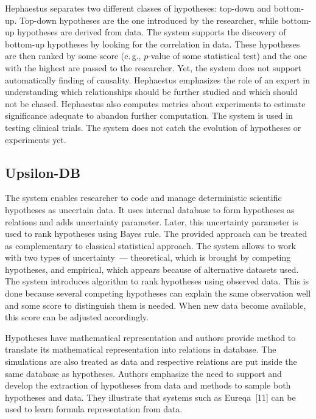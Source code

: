 \begin{multicols}{2}
      Hephaestus separates two different classes of hypotheses: top-down and 
bottom-up. Top-down hypotheses are the one introduced by the researcher, while 
bottom-up hypotheses are derived from data. The system supports the discovery of 
bottom-up hypotheses by looking for the correlation in data. These hypotheses are 
then ranked by some score (e.\,g., $p$-value of some statistical test) and the one with 
the highest are passed to the researcher. Yet, the system does not support 
automatically finding of causality. Hephaestus emphasizes the role of an expert in 
understanding which relationships should be further studied and which should not be 
chased. Hephaestus also computes metrics about experiments to estimate significance 
adequate to abandon further computation. The system is used in testing clinical trials. 
The system does not catch the evolution of hypotheses or experiments yet.

\vspace*{-9pt}

\subsection{Upsilon-DB}

\vspace*{-2pt}

      \noindent
      The system enables researcher to code and manage deterministic scientific 
hypotheses as uncertain data. It uses internal database to form hypotheses as relations 
and adds uncertainty parameter. Later, this uncertainty parameter is used to rank 
hypotheses using Bayes rule. The provided approach can be treated as 
complementary to classical statistical approach. The system allows to work with two 
types of uncertainty~--- theoretical, which is brought by competing hypotheses, and 
empirical, which appears because of alternative datasets used. The system 
introduces algorithm to rank hypotheses using observed data. This is done because 
several competing hypotheses can explain the same observation well and some score 
to distinguish them is needed. When new data become available, this score can be 
adjusted accordingly.
      
      Hypotheses have mathematical representation and authors provide method to 
translate its mathematical representation into relations in database. The simulations 
are also treated as data and respective relations are put inside the same database as 
hypotheses. Authors emphasize the need to support and develop the extraction of 
hypotheses from data and methods to sample both hypotheses and data. They 
illustrate that systems such as Eureqa~[11] can be used to learn formula 
representation from data.
      

\end{multicols}
